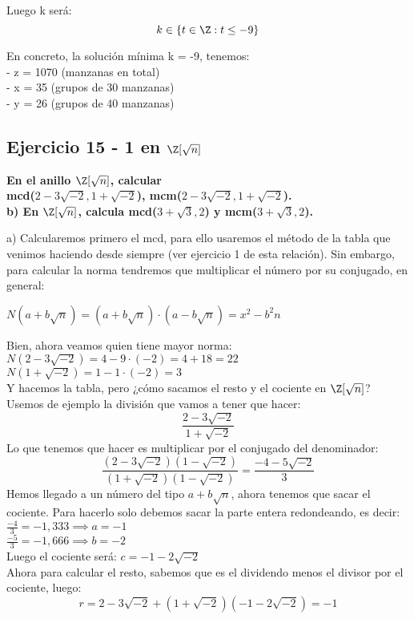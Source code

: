 \documentclass[11pt, a4paper, titlepage]{article}
\begin{document}
Luego k será:
$$ k \in \{ t \in \Z : t \leq -9 \} $$

En concreto, la solución mínima k = -9, tenemos: \\
- z = 1070 (manzanas en total) \\
- x = 35 (grupos de 30 manzanas) \\
- y = 26 (grupos de 40 manzanas) \\

\subsection{\LARGE{Ejercicio 15 - 1 en $\Z [\sqrt{n}]$}}

\textbf{En el anillo $\Z [\sqrt{n}]$, calcular \\
	mcd($2-3\sqrt{-2},1+\sqrt{-2}$), mcm($2-3\sqrt{-2},1+\sqrt{-2}$).\\
	b) En $\Z [\sqrt{n}]$, calcula mcd($3+\sqrt{3},2$) y mcm($3+\sqrt{3},2$).}
	
a) Calcularemos primero el mcd, para ello usaremos el método de la tabla que venimos haciendo
desde siempre (ver ejercicio 1 de esta relación). Sin embargo, para calcular la norma tendremos
que multiplicar el número por su conjugado, en general:

$N(a+b\sqrt{n}) = (a+b\sqrt{n}) \cdot (a-b\sqrt{n}) = x^{2} - b^{2}n $

Bien, ahora veamos quien tiene mayor norma: \\
$ N(2-3\sqrt{-2}) = 4 - 9 \cdot (-2) = 4 + 18 = 22 $ \\
$ N(1+\sqrt{-2}) = 1 - 1 \cdot (-2) = 3 $ \\

Y hacemos la tabla, pero ¿cómo sacamos el resto y el cociente en $\Z[\sqrt{n}]$? Usemos de ejemplo la división
que vamos a tener que hacer:
$$ \frac{2-3\sqrt{-2}}{1+\sqrt{-2}} $$
Lo que tenemos que hacer es multiplicar por el conjugado del denominador:
$$ \frac{(2-3\sqrt{-2})(1-\sqrt{-2})}{(1+\sqrt{-2})(1-\sqrt{-2})} = \frac{-4-5\sqrt{-2}}{3} $$
Hemos llegado a un número del tipo $a+b\sqrt{n}$, ahora tenemos que sacar el cociente. Para hacerlo
solo debemos sacar la parte entera redondeando, es decir: \\
$ \frac{-4}{3} = -1,333 \implies a = -1 $ \\
$ \frac{-5}{3} = -1,666 \implies b = -2 $ \\
Luego el cociente será: $ c = -1-2\sqrt{-2} $ \\
Ahora para calcular el resto, sabemos que es el dividendo menos el divisor por el cociente, luego:
$$ r = 2-3\sqrt{-2} + (1+\sqrt{-2})(-1-2\sqrt{-2}) = -1 $$
\end{document}

